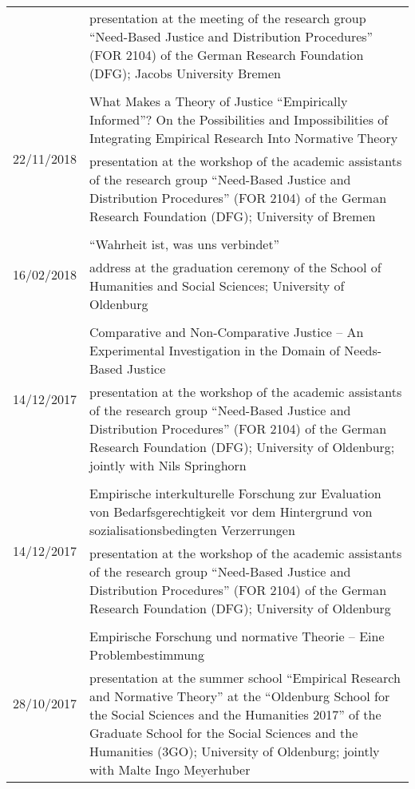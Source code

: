 \documentclass[a4paper,10pt]{article}
\begin{document}
\begin{longtable}{p{2.5cm}p{11cm}}
& \footnotesize{presentation at the meeting of the research group \enquote{Need-Based Justice and Distribution Procedures} (FOR 2104) of the German Research Foundation (DFG); Jacobs University Bremen}\\
\\
\multirow{2}{2.5cm}{\footnotesize{22/11/2018}} & What Makes a Theory of Justice \enquote{Empirically Informed}? On the Possibilities and Impossibilities of Integrating Empirical Research Into Normative Theory\\
& \footnotesize{presentation at the workshop of the academic assistants of the research group \enquote{Need-Based Justice and Distribution Procedures} (FOR 2104) of the German Research Foundation (DFG); University of Bremen}\\
\\
\multirow{2}{2.5cm}{\footnotesize{16/02/2018}} & \enquote{Wahrheit ist, was uns verbindet}\\
& \footnotesize{address at the graduation ceremony of the School of Humanities and Social Sciences; University of Oldenburg}\\
\\
\multirow{2}{2.5cm}{\footnotesize{14/12/2017}} & Comparative and Non-Comparative Justice -- An Experimental Investigation in the Domain of Needs-Based Justice\\
& \footnotesize{presentation at the workshop of the academic assistants of the research group \enquote{Need-Based Justice and Distribution Procedures} (FOR 2104) of the German Research Foundation (DFG); University of Oldenburg; jointly with Nils Springhorn}\\
\\
\multirow{2}{2.5cm}{\footnotesize{14/12/2017}} & Empirische interkulturelle Forschung zur Evaluation von Bedarfsgerechtigkeit vor dem Hintergrund von sozialisationsbedingten Verzerrungen\\
& \footnotesize{presentation at the workshop of the academic assistants of the research group \enquote{Need-Based Justice and Distribution Procedures} (FOR 2104) of the German Research Foundation (DFG); University of Oldenburg}\\
\\
\multirow{2}{2.5cm}{\footnotesize{28/10/2017}} & Empirische Forschung und normative Theorie -- Eine Problembestimmung\\
& \footnotesize{presentation at the summer school \enquote{Empirical Research and Normative Theory} at the \enquote{Oldenburg School for the Social Sciences and the Humanities 2017} of the Graduate School for the Social Sciences and the Humanities (3GO); University of Oldenburg; jointly with Malte Ingo Meyerhuber}\\

\end{longtable}
\end{document}
